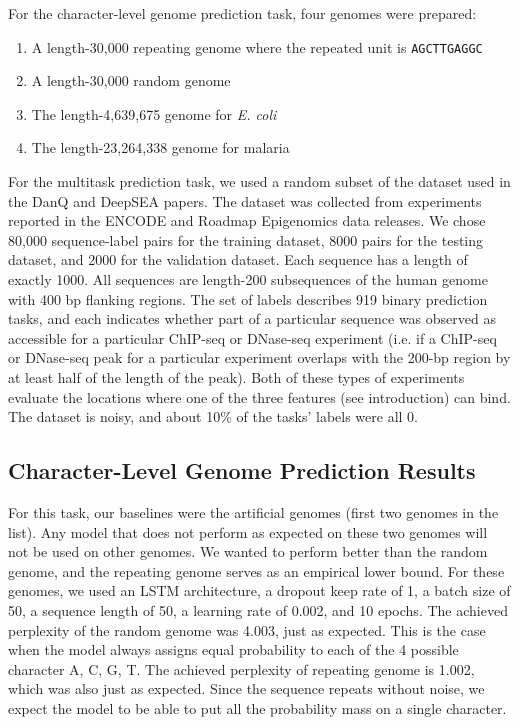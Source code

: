 \documentclass{article} %
\begin{document}
For the character-level genome prediction task, four genomes were prepared:
\begin{enumerate}
	\item A length-30,000 repeating genome where the repeated unit is \texttt{AGCTTGAGGC}
	\item A length-30,000 random genome
	\item The length-4,639,675 genome for \textit{E. coli}
	\item The length-23,264,338 genome for malaria
\end{enumerate}

For the multitask prediction task, we used a random subset of the dataset used in the DanQ \cite{quang2015danq} and DeepSEA \cite{zhou2015predicting} papers. The dataset was collected from experiments reported in the ENCODE and Roadmap Epigenomics data releases. We chose 80,000 sequence-label pairs for the training dataset, 8000 pairs for the testing dataset, and 2000 for the validation dataset. Each sequence has a length of exactly 1000. All sequences are length-200 subsequences of the human genome with 400 bp flanking regions. The set of labels describes 919 binary prediction tasks, and each indicates whether part of a particular sequence was observed as accessible for a particular ChIP-seq or DNase-seq experiment (i.e. if a ChIP-seq or DNase-seq peak for a particular experiment overlaps with the 200-bp region by at least half of the length of the peak). Both of these types of experiments evaluate the locations where one of the three features (see introduction) can bind. The dataset is noisy, and about 10\% of the tasks' labels were all 0.

\subsection{Character-Level Genome Prediction Results}

For this task, our baselines were the artificial genomes (first two genomes in the list). Any model that does not perform as expected on these two genomes will not be used on other genomes. We wanted to perform better than the random genome, and the repeating genome serves as an empirical lower bound. For these genomes, we used an LSTM architecture, a dropout keep rate of 1, a batch size of 50, a sequence length of 50, a learning rate of 0.002, and 10 epochs. The achieved perplexity of the random genome was 4.003, just as expected. This is the case when the model always assigns equal probability to each of the 4 possible character A, C, G, T. The achieved perplexity of repeating genome is 1.002, which was also just as expected. Since the sequence repeats without noise, we expect the model to be able to put all the probability mass on a single character.
\end{document}
